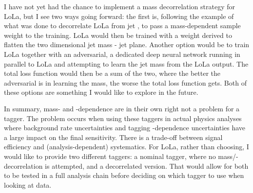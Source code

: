 I have not yet had the chance to implement a mass decorrelation strategy for LoLa, but I see two ways going forward: the first is, following the example of what was done to decorrelate LoLa from jet \PT, to pass a mass-dependent sample weight to the training. LoLa would then be trained with a weight derived to flatten the two dimensional jet mass - jet \PT plane. Another option would be to train LoLa together with an adversarial, a dedicated deep neural network running in parallel to LoLa and attempting to learn the jet mass from the LoLa output. The total loss function would then be a sum of the two, where the better the adversarial is in learning the mass, the worse the total loss function gets. Both of these options are something I would like to explore in the future.\par

In summary, mass- and \PT-dependence are in their own right not a problem for a tagger. The problem occurs when using these taggers in actual physics analyses where background rate uncertainties and tagging \PT-dependence uncertainties have a large impact on the final sensitivity. There is a trade-off between signal efficiency and (analysis-dependent) systematics. For LoLa, rather than choosing, I would like to provide two different taggers: a nominal tagger, where no mass/\PT-decorrelation is attempted, and a decorrelated version. That would allow for both to be tested in a full analysis chain before deciding on which tagger to use when looking at data.

